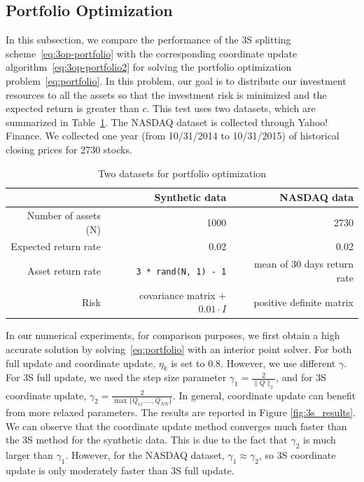 \subsection{Portfolio Optimization}
In this subsection, we compare the performance of the 3S splitting scheme~\eqref{eq:3op-portfolio} with the corresponding coordinate update algorithm~\eqref{eq:3op-portfolio2} for solving the portfolio optimization problem~\eqref{eq:portfolio}. In this problem, our goal is to distribute our investment resources to all the assets so that the investment risk is minimized and the expected return is greater than $c$. This test uses two datasets, which are summarized in Table~\ref{tab:3s-data}. The NASDAQ dataset is collected through Yahoo! Finance. We collected one year (from 10/31/2014 to 10/31/2015) of historical closing prices for 2730 stocks. 

\begin{table}[htbp]
\centering
 \begin{tabular}{rrr}
  \toprule
    & Synthetic data  & NASDAQ data\\
   \midrule
   Number of assets (N) & 1000 & 2730 \\
   Expected return rate & 0.02 & 0.02 \\
   Asset return rate & \texttt{3 * rand(N, 1) - 1} & mean of 30 days return rate \\
   Risk & covariance matrix + $0.01\cdot I$ & positive definite matrix \\
   \bottomrule
\end{tabular}
 \caption{Two datasets for portfolio optimization \label{tab:3s-data}}
\end{table}

In our numerical experiments, for comparison purposes, we first obtain a high accurate solution by solving~\eqref{eq:portfolio} with an interior point solver. For both full update and coordinate update, $\eta_k$ is set to 0.8. However, we use different $\gamma$. For 3S full update, we used the step size parameter $\gamma_1 = \frac{2}{\|Q\|_2}$, and for 3S coordinate update, $\gamma_2 = \frac{2}{\max\{Q_{11}, ..., Q_{NN}\}}$. In general, coordinate update can benefit from more relaxed parameters. The results are reported in Figure \ref{fig:3s_results}. We can observe that the coordinate update method converges much faster than the 3S method for the synthetic data. This is due to the fact that $\gamma_2$ is much larger than $\gamma_1$. However, for the NASDAQ dataset, $\gamma_1 \approx \gamma_2$, so 3S coordinate update is only moderately faster than 3S full update.

